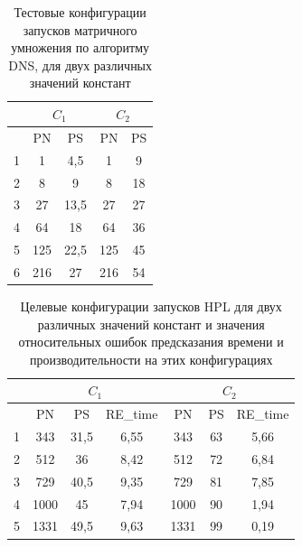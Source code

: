 			\begin{table}
				\centering
				\begin{tabular}{|r||c|c||c|c|}
					\hline
					            & \multicolumn{2}{c||}{\(C_1\)} & \multicolumn{2}{c|}{\(C_2\)}  \\ \hline
					\textnumero & PN  & PS                      & PN  & PS                      \\ \hline
					1           & 1   & 4,5                     & 1   & 9                       \\ \hline
					2           & 8   & 9                       & 8   & 18                      \\ \hline
					3           & 27  & 13,5                    & 27  & 27                      \\ \hline
					4           & 64  & 18                      & 64  & 36                      \\ \hline
					5           & 125 & 22,5                    & 125 & 45                      \\ \hline
					6           & 216 & 27                      & 216 & 54                      \\ \hline
				\end{tabular}
				\caption{Тестовые конфигурации запусков матричного умножения по алгоритму DNS, для двух различных значений констант}
				\label{test_DNS}
			\end{table}

			\begin{table}
				\centering
				\begin{tabular}{|r||c|c|c||c|c|c|}
					\hline
					            & \multicolumn{3}{|c|}{\(C_1\)} & \multicolumn{3}{|c|}{\(C_2\)} \\ \hline
					\textnumero & PN   & PS   & RE\_time        & PN   & PS & RE\_time          \\ \hline
					1           & 343  & 31,5 & 6,55            & 343  & 63 & 5,66              \\ \hline
					2           & 512  & 36   & 8,42            & 512  & 72 & 6,84              \\ \hline
					3           & 729  & 40,5 & 9,35            & 729  & 81 & 7,85              \\ \hline
					4           & 1000 & 45   & 7,94            & 1000 & 90 & 1,94              \\ \hline
					5           & 1331 & 49,5 & 9,63            & 1331 & 99 & 0,19              \\ \hline
				\end{tabular}
				\caption{Целевые конфигурации запусков HPL для двух различных значений констант и значения относительных ошибок предсказания времени и производительности на этих конфигурациях}
				\label{target_DNS}
			\end{table}

